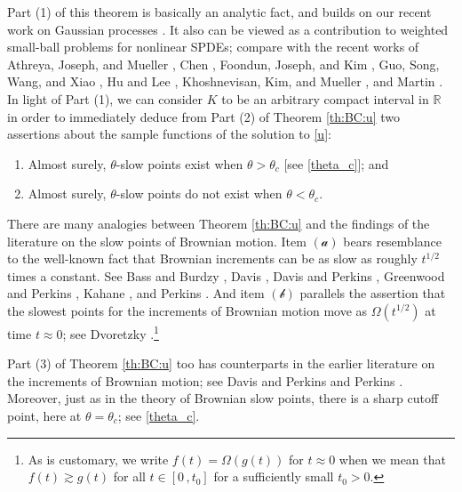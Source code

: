 \documentclass[reqno]{amsart}
\newcommand{\<}{\langle}
\renewcommand{\>}{\rangle}
\newcommand{\R}{\mathbb{R}}
\newcommand{\1}{\mathbb{1}}
\theoremstyle{definition}
\numberwithin{equation}{section}
\begin{document}
Part (1) of this theorem is basically an analytic fact, and builds on our
recent work on Gaussian processes \cite{KL}. It also can be viewed as a contribution
to weighted small-ball problems for nonlinear SPDEs; compare with the recent works of Athreya, Joseph, and Mueller \cite{AthreyaJosephMueller},
Chen \cite{Chen},
Foondun, Joseph, and Kim \cite{FoondunJosephKim},
Guo, Song, Wang, and Xiao \cite{GuoSongWangXiao},
Hu and Lee \cite{HuLee},
Khoshnevisan, Kim, and Mueller \cite{KKimMueller},
and Martin \cite{Martin}.
In light of Part (1), we can consider $K$
to be an arbitrary compact interval in $\R$ in order to immediately deduce from
Part (2) of Theorem \ref{th:BC:u} two assertions about the sample
functions of the solution to \eqref{u}: 
\begin{enumerate}
\item[$(\mathscr{a})$]  Almost surely, $\theta$-slow points
	exist when $\theta>\theta_c$ [see \eqref{theta_c}]; and 
\item[$(\mathscr{b})$] Almost surely, $\theta$-slow points
	do not exist when $\theta<\theta_c$. 
\end{enumerate}

There are many analogies between Theorem \ref{th:BC:u}
and the findings of the literature on the slow points of
Brownian motion.
Item $(\mathscr{a})$ bears resemblance
to the well-known fact that Brownian increments can be as slow as
roughly $t^{1/2}$ times a constant. See Bass and Burdzy \cite{BassBurdzy},
Davis \cite{Davis1983}, Davis and Perkins \cite{DavisPerkins},
Greenwood and Perkins \cite{GreenwoodPerkins},
Kahane \cite{Kahane1974,Kahane1976,Kahane1983},
and Perkins \cite{Perkins1983}.
And item $(\mathscr{b})$ parallels
the assertion that the slowest points for the increments of Brownian motion
move as $\Omega(t^{1/2})$  at time $t\approx 0$; see Dvoretzky
\cite{Dvoretzky}.\footnote{As is customary, we write
	$f(t)=\Omega(g(t))$ for $t\approx0$ when we mean that
	$f(t)\gtrsim g(t)$ for all $t\in[0\,,t_0]$ for a sufficiently small $t_0>0$.}

Part (3) of Theorem \ref{th:BC:u} too has counterparts 
in the earlier literature  on the increments of
Brownian motion; see Davis and Perkins \cite{DavisPerkins}
and Perkins \cite{Perkins1983}. 
Moreover, just as in the theory of Brownian slow points,  there is a sharp
cutoff point, here at $\theta=\theta_c$; see \eqref{theta_c}. 
\end{document}
